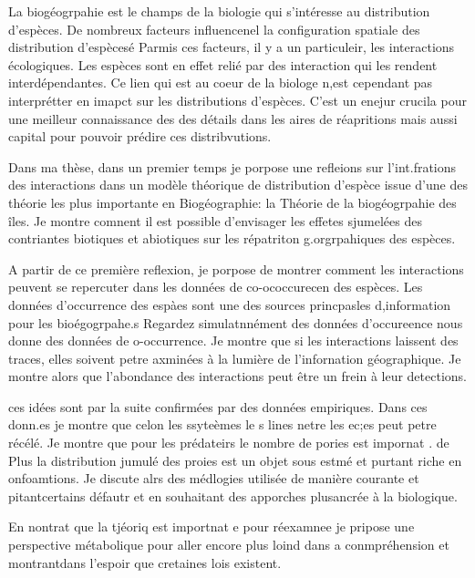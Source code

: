 La biogéogrpahie est le champs de la biologie qui s'intéresse au
distribution d'espèces. De nombreux facteurs influencenel la
configuration spatiale des distribution d'espècesé Parmis ces facteurs,
il y a un particuleir, les interactions écologiques. Les espèces sont en
effet relié par des interaction qui les rendent interdépendantes. Ce
lien qui est au coeur de la biologe n,est cependant pas interprétter en
imapct sur les distributions d'espèces. C'est un enejur crucila pour une
meilleur connaissance des des détails dans les aires de réapritions mais
aussi capital pour pouvoir prédire ces distribvutions.

Dans ma thèse, dans un premier temps je porpose une refleions sur
l'int.frations des interactions dans un modèle théorique de distribution
d'espèce issue d'une des théorie les plus importante en Biogéographie:
la Théorie de la biogéogrpahie des îles. Je montre comnent il est
possible d'envisager les effetes sjumelées des contriantes biotiques et
abiotiques sur les répatriton g.orgrpahiques des espèces.

A partir de ce première reflexion, je porpose de montrer comment les
interactions peuvent se repercuter dans les données de co-ococcurecen
des espèces. Les données d'occurrence des espàes sont une des sources
princpasles d,information pour les bioégogrpahe.s Regardez
simulatnnément des données d'occureence nous donne des données de
o-occurrence. Je montre que si les interactions laissent des traces,
elles soivent petre axminées à la lumière de l'infornation géographique.
Je montre alors que l'abondance des interactions peut être un frein à
leur detections.

ces idées sont par la suite confirmées par des données empiriques. Dans
ces donn.es je montre que celon les ssyteèmes le s lines netre les ec;es
peut petre récélé. Je montre que pour les prédateirs le nombre de pories
est impornat . de Plus la distribution jumulé des proies est un objet
sous estmé et purtant riche en onfoamtions. Je discute alrs des
médlogies utilisée de manière courante et pitantcertains défautr et en
souhaitant des apporches plusancrée à la biologique.

En nontrat que la tjéoriq est importnat e pour réexamnee je pripose une
perspective métabolique pour aller encore plus loind dans a
conmpréhension et montrantdans l'espoir que cretaines lois existent.
